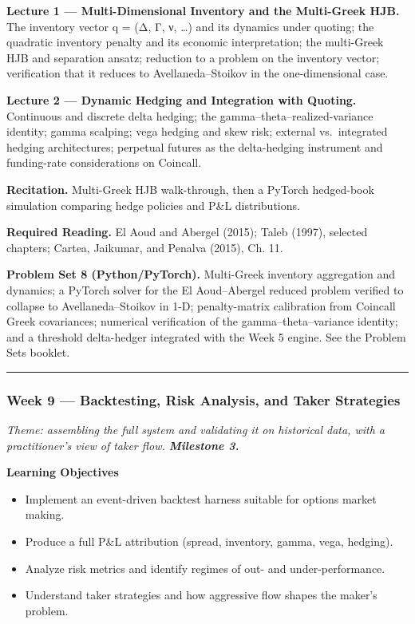 \documentclass[
]{article}
\providecommand{\tightlist}{%
  \setlength{\itemsep}{0pt}\setlength{\parskip}{0pt}}
\begin{document}
\textbf{Lecture 1 --- Multi-Dimensional Inventory and the Multi-Greek
HJB.} The inventory vector q = (Δ, Γ, ν, \ldots) and its dynamics under
quoting; the quadratic inventory penalty and its economic
interpretation; the multi-Greek HJB and separation ansatz; reduction to
a problem on the inventory vector; verification that it reduces to
Avellaneda--Stoikov in the one-dimensional case.

\textbf{Lecture 2 --- Dynamic Hedging and Integration with Quoting.}
Continuous and discrete delta hedging; the
gamma--theta--realized-variance identity; gamma scalping; vega hedging
and skew risk; external vs.~integrated hedging architectures; perpetual
futures as the delta-hedging instrument and funding-rate considerations
on Coincall.

\textbf{Recitation.} Multi-Greek HJB walk-through, then a PyTorch
hedged-book simulation comparing hedge policies and P\&L distributions.

\textbf{Required Reading.} El Aoud and Abergel (2015); Taleb (1997),
selected chapters; Cartea, Jaikumar, and Penalva (2015), Ch. 11.

\textbf{Problem Set 8 (Python/PyTorch).} Multi-Greek inventory
aggregation and dynamics; a PyTorch solver for the El Aoud--Abergel
reduced problem verified to collapse to Avellaneda--Stoikov in 1-D;
penalty-matrix calibration from Coincall Greek covariances; numerical
verification of the gamma--theta--variance identity; and a threshold
delta-hedger integrated with the Week 5 engine. See the Problem Sets
booklet.

\begin{center}\rule{0.5\linewidth}{0.5pt}\end{center}

\subsubsection{Week 9 --- Backtesting, Risk Analysis, and Taker
Strategies}\label{week-9-backtesting-risk-analysis-and-taker-strategies}

\emph{Theme: assembling the full system and validating it on historical
data, with a practitioner's view of taker flow. \textbf{Milestone 3.}}

\textbf{Learning Objectives}

\begin{itemize}
\tightlist
\item
  Implement an event-driven backtest harness suitable for options market
  making.
\item
  Produce a full P\&L attribution (spread, inventory, gamma, vega,
  hedging).
\item
  Analyze risk metrics and identify regimes of out- and
  under-performance.
\item
  Understand taker strategies and how aggressive flow shapes the maker's
  problem.
\end{itemize}
\end{document}
